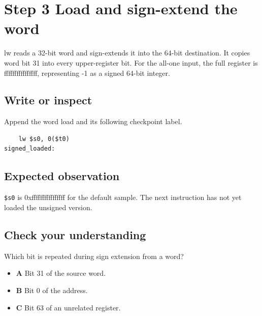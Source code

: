 \section{Step 3 Load and sign-extend the
  word}\label{004-bit-inspector-s03-step-3-load-and-sign-extend-the-word}

lw reads a 32-bit word and sign-extends it into the 64-bit destination.
It copies word bit 31 into every upper-register bit. For the all-one
input, the full register is ffffffffffffffff, representing -1 as a
signed 64-bit integer.

\subsection{Write or
  inspect}\label{004-bit-inspector-s03-write-or-inspect}

Append the word load and its following checkpoint label.

\begin{verbatim}
    lw $s0, 0($t0)
signed_loaded:
\end{verbatim}

\subsection{Expected
  observation}\label{004-bit-inspector-s03-expected-observation}

\texttt{\$s0} is 0xffffffffffffffff for the default sample. The next
instruction has not yet loaded the unsigned version.

\subsection{Check your
  understanding}\label{004-bit-inspector-s03-check-your-understanding}

Which bit is repeated during sign extension from a word?

\begin{itemize}
  \tightlist
  \item
        \textbf{A} Bit 31 of the source word.
  \item
        \textbf{B} Bit 0 of the address.
  \item
        \textbf{C} Bit 63 of an unrelated register.
\end{itemize}
